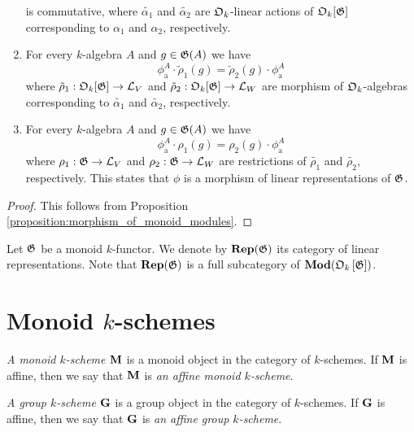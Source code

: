 \begin{corollary}
\begin{enumerate}[label=\emph{\textbf{(\roman*)}}, leftmargin=1.5em]
\begin{center}
\end{center}
is commutative, where $\tilde{\alpha_1}$ and $\tilde{\alpha_2}$ are ${\mathfrak O}_k$-linear actions of ${\mathfrak O}_k[{\mathfrak G}]$ corresponding to $\alpha_1$ and $\alpha_2$, respectively. 
\item For every $k$-algebra $A$ and $g \in {\mathfrak G}(A)$ we have
$$\phi_{\mathrm{a}}^A \cdot \tilde{\rho}_1(g) = \tilde{\rho}_2(g) \cdot \phi_{\mathrm{a}}^A$$
where $\tilde{\rho}_1:{\mathfrak O}_k[{\mathfrak G}] \rightarrow {\mathcal L}_V$ and $\tilde{\rho}_2:{\mathfrak O}_k[{\mathfrak G}] \rightarrow {\mathcal L}_W$ are morphism of ${\mathfrak O}_k$-algebras corresponding to $\tilde{\alpha_1}$ and $\tilde{\alpha_2}$, respectively.
\item For every $k$-algebra $A$ and $g \in {\mathfrak G}(A)$ we have
$$\phi_{\mathrm{a}}^A \cdot \rho_1(g) = \rho_2(g) \cdot \phi_{\mathrm{a}}^A$$
where $\rho_1:{\mathfrak G} \rightarrow {\mathcal L}_V$ and $\rho_2:{\mathfrak G} \rightarrow {\mathcal L}_W$ are restrictions of $\tilde{\rho_1}$ and $\tilde{\rho_2}$, respectively. This states that $\phi$ is a morphism of linear representations of ${\mathfrak G}$.
\end{enumerate}
\end{corollary}
\begin{proof}
This follows from Proposition \ref{proposition:morphism_of_monoid_modules}.
\end{proof}
\noindent
Let ${\mathfrak G}$ be a monoid $k$-functor. We denote by $\mathbf{Rep}({\mathfrak G})$ its category of linear representations. Note that $\mathbf{Rep}({\mathfrak G})$ is a full subcategory of $\mathbf{Mod}({\mathfrak O}_k\left[{\mathfrak G}\right])$.

\section{Monoid $k$-schemes}

\begin{definition}
\textit{A monoid $k$-scheme $\mathbf{M}$} is a monoid object in the category of $k$-schemes. If $\mathbf{M}$ is affine, then we say that $\mathbf{M}$ is \textit{an affine monoid $k$-scheme}.
\end{definition}

\begin{definition}
\textit{A group $k$-scheme $\mathbf{G}$} is a group object in the category of $k$-schemes. If $\mathbf{G}$ is affine, then we say that $\mathbf{G}$ is \textit{an affine group $k$-scheme}.
\end{definition}

